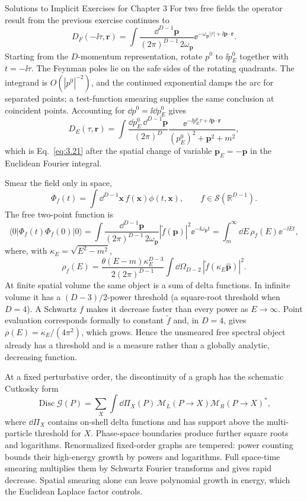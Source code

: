 \begin{bankssolutions}{Solutions to Implicit Exercises for Chapter 3}
For two free fields the operator result from the previous exercise continues
to
\[
 D_F(-\ii\tau,\mathbf r)
 =\int\frac{\dd^{D-1}\mathbf p}{(2\pi)^{D-1}\,2\omega_{\mathbf p}}
 \ee^{-\omega_{\mathbf p}|\tau|+\ii\mathbf p\cdot\mathbf r}.
\]
Starting from the $D$-momentum representation, rotate $p^0$ to
$\ii p_E^0$ together with $t=-\ii\tau$.  The Feynman poles lie on the safe
sides of the rotating quadrants.  The integrand is $O(|p^0|^{-2})$, and the
continued exponential damps the arc for separated points; a test-function
smearing supplies the same conclusion at coincident points.  Accounting for
$\dd p^0=\ii\dd p_E^0$ gives
\[
 D_E(\tau,\mathbf r)=\int\frac{\dd p_E^0\,\dd^{D-1}\mathbf p}{(2\pi)^D}
 \frac{\ee^{-\ii p_E^0\tau+\ii\mathbf p\mathbin{\cdot}\mathbf r}}
 {(p_E^0)^2+\mathbf p^2+m^2},
\]
which is Eq.~\eqref{eq:3.21} after the spatial change of variable
$\mathbf p_E=-\mathbf p$ in the Euclidean Fourier integral.

Smear the field only in space,
\[
 \Phi_f(t)=\int\dd^{D-1}\mathbf x\,f(\mathbf x)\phi(t,\mathbf x),
 \qquad f\in\mathcal S(\mathbb R^{D-1}).
\]
The free two-point function is
\[
 \langle0|\Phi_f(t)\Phi_f(0)|0\rangle
 =\int\frac{\dd^{D-1}\mathbf p}{(2\pi)^{D-1}\,2\omega_{\mathbf p}}
 |\widetilde f(\mathbf p)|^2\ee^{-\ii\omega_{\mathbf p}t}
 =\int_m^\infty\dd E\,\rho_f(E)\ee^{-\ii Et},
\]
where, with $\kappa_E=\sqrt{E^2-m^2}$,
\[
 \rho_f(E)=\frac{\theta(E-m)\kappa_E^{D-3}}{2(2\pi)^{D-1}}
 \int\dd\Omega_{D-2}\,|\widetilde f(\kappa_E\widehat{\mathbf p})|^2.
\]
At finite spatial volume the same object is a sum of delta functions.  In
infinite volume it has a $(D-3)/2$-power threshold (a square-root threshold when
$D=4$).  A Schwartz $f$ makes it decrease faster than every power as $E\to\infty$.
Point evaluation
corresponds formally to constant $\widetilde f$ and, in $D=4$, gives
$\rho(E)=\kappa_E/(4\pi^2)$, which grows.  Hence the unsmeared free spectral object
already has a threshold and is a measure rather than a globally analytic,
decreasing function.

At a fixed perturbative order, the discontinuity of a graph has the schematic
Cutkosky form
\[
 \operatorname{Disc}\mathcal G(P)
 =\sum_X\int\dd\Pi_X(P)\,
 \mathcal M_L(P\to X)\mathcal M_R(P\to X)^*,
\]
where $\dd\Pi_X$ contains on-shell delta functions and has support above the
multi-particle threshold for $X$.  Phase-space boundaries produce further
square roots and logarithms.  Renormalized fixed-order graphs are tempered:
power counting bounds their high-energy growth by powers and logarithms.  Full
space-time smearing multiplies them by Schwartz Fourier transforms and gives
rapid decrease.  Spatial smearing alone can leave polynomial growth in energy,
which the Euclidean Laplace factor controls.


\end{bankssolutions}

